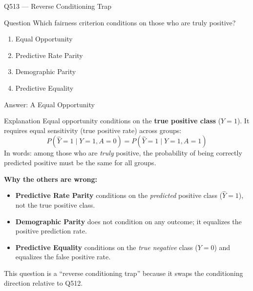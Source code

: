 \documentclass[aspectratio=169,8pt]{beamer}
\begin{document}
\begin{frame}{Q513 --- Reverse Conditioning Trap}
	\begin{block}{Question}
		Which fairness criterion conditions on those who are truly positive?
		\begin{enumerate}
			\item Equal Opportunity
			\item Predictive Rate Parity
			\item Demographic Parity
			\item Predictive Equality
		\end{enumerate}
	\end{block}
	\begin{exampleblock}{Answer: A}
		Equal Opportunity
	\end{exampleblock}
	\begin{block}{Explanation}
		Equal opportunity conditions on the \textbf{true positive class} (\(Y = 1\)).
		It requires equal sensitivity (true positive rate) across groups:
		\[
		P(\hat{Y} = 1 \mid Y = 1, A = 0) = P(\hat{Y} = 1 \mid Y = 1, A = 1)
		\]
		In words: among those who are \emph{truly} positive, the probability of being
		correctly predicted positive must be the same for all groups.
		
		\textbf{Why the others are wrong:}
		\begin{itemize}
			\item \textbf{Predictive Rate Parity} conditions on the \emph{predicted}
			positive class (\(\hat{Y} = 1\)), not the true positive class.
			\item \textbf{Demographic Parity} does not condition on any outcome;
			it equalizes the positive prediction rate.
			\item \textbf{Predictive Equality} conditions on the \emph{true negative}
			class (\(Y = 0\)) and equalizes the false positive rate.
		\end{itemize}
		This question is a ``reverse conditioning trap'' because it swaps the
		conditioning direction relative to Q512.
	\end{block}
\end{frame}
\end{document}
